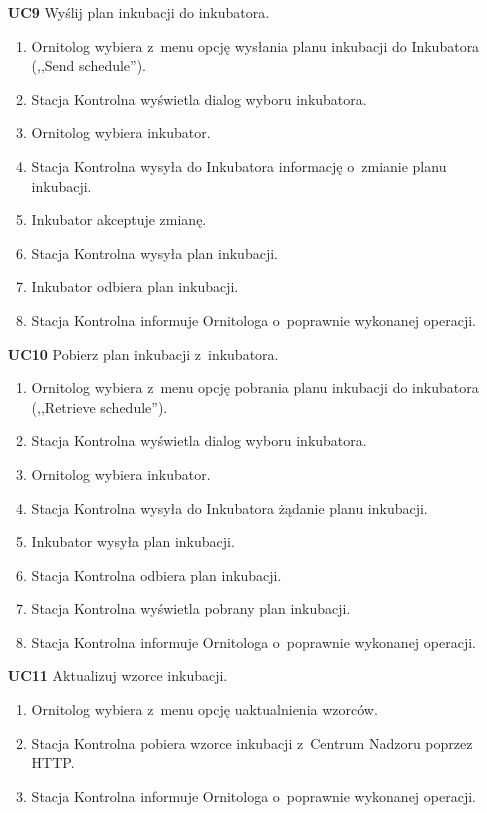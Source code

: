 \begin{itemize}
	\item[\textbf{UC9}] Wyślij plan inkubacji do inkubatora.
		\begin{enumerate}
			\item Ornitolog wybiera z~menu opcję wysłania planu inkubacji do Inkubatora (,,Send schedule'').
			\item Stacja Kontrolna wyświetla dialog wyboru inkubatora.
			\item Ornitolog wybiera inkubator.
			\item Stacja Kontrolna wysyła do Inkubatora informację o~zmianie planu inkubacji.
			\item Inkubator akceptuje zmianę.
			\item Stacja Kontrolna wysyła plan inkubacji.
			\item Inkubator odbiera plan inkubacji.
			\item Stacja Kontrolna informuje Ornitologa o~poprawnie wykonanej operacji.
		\end{enumerate}

	\item[\textbf{UC10}] Pobierz plan inkubacji z~inkubatora.
		\begin{enumerate}
			\item Ornitolog wybiera z~menu opcję pobrania planu inkubacji do inkubatora (,,Retrieve schedule'').
			\item Stacja Kontrolna wyświetla dialog wyboru inkubatora.
			\item Ornitolog wybiera inkubator.
			\item Stacja Kontrolna wysyła do Inkubatora żądanie planu inkubacji.
			\item Inkubator wysyła plan inkubacji.
			\item Stacja Kontrolna odbiera plan inkubacji.
			\item Stacja Kontrolna wyświetla pobrany plan inkubacji.
			\item Stacja Kontrolna informuje Ornitologa o~poprawnie wykonanej operacji.
		\end{enumerate}

	\item[\textbf{UC11}] Aktualizuj wzorce inkubacji.
		\begin{enumerate}
			\item Ornitolog wybiera z~menu opcję uaktualnienia wzorców.
			\item Stacja Kontrolna pobiera wzorce inkubacji z~Centrum Nadzoru poprzez HTTP.
			\item Stacja Kontrolna informuje Ornitologa o~poprawnie wykonanej operacji.
		\end{enumerate}


\end{itemize}
